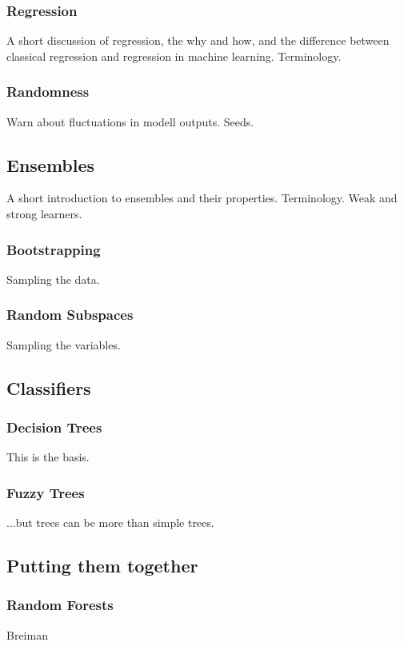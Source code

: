 \documentclass[a4paper,man,12pt,apacite]{apa6} %
\begin{document}
\subsubsection{Regression}
A short discussion of regression, the why and how, and the difference
between classical regression and regression in machine learning.
Terminology.

\subsubsection{Randomness}
Warn about fluctuations in modell outputs. Seeds.

\subsection{Ensembles}
A short introduction to ensembles and their properties. Terminology.
Weak and strong learners.

\subsubsection{Bootstrapping}
Sampling the data.

\subsubsection{Random Subspaces}
Sampling the variables.

\subsection{Classifiers}

\subsubsection{Decision Trees}
This is the basis.

\subsubsection{Fuzzy Trees}
...but trees can be more than simple trees.

\subsection{Putting them together}

\subsubsection{Random Forests}
Breiman
\end{document}
